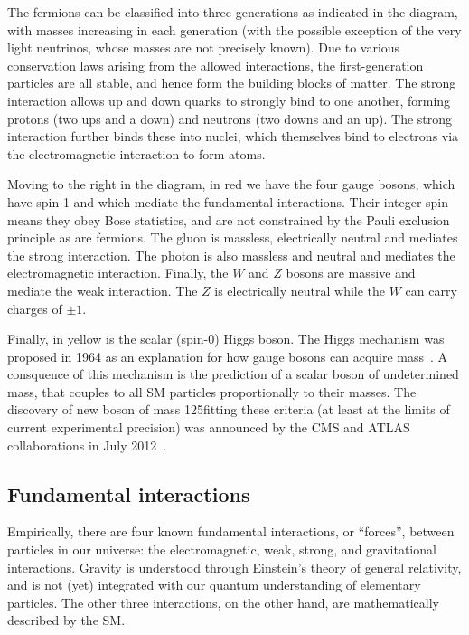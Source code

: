 The fermions can be classified into three generations as indicated in the diagram, with masses
increasing in each generation (with the possible exception of the very light neutrinos, whose
masses are not precisely known). Due to various conservation laws arising from the allowed 
interactions, the first-generation particles are all stable, and hence form the building
blocks of matter. The strong interaction allows up and down quarks to strongly bind to
one another, forming protons (two ups and a down) and neutrons (two downs and an up).
The strong interaction further binds these into nuclei, which themselves bind to electrons via the electromagnetic
interaction to form atoms.

Moving to the right in the diagram, in red we have the four gauge bosons, which have spin-1
and which mediate the fundamental interactions. Their integer spin means they obey Bose statistics,
and are not constrained by the Pauli exclusion principle as are fermions. 
The gluon is massless, electrically neutral and mediates the strong
interaction. The photon is also massless and neutral and mediates the electromagnetic interaction. Finally,
the $W$ and $Z$ bosons are massive and mediate the weak interaction. The $Z$ is electrically neutral while 
the $W$ can carry charges of $\pm1$.

Finally, in yellow is the scalar (spin-0) Higgs boson. The Higgs mechanism was proposed in 1964 as an explanation
for how gauge bosons can acquire mass~\cite{Englert,Higgs,Guralnik}. A consquence of this mechanism is the prediction of a
scalar boson of undetermined mass, that couples to all SM particles proportionally to their masses.
The discovery of new boson of mass 125\GeV fitting these criteria (at least at the limits of current experimental precision) 
was announced by the CMS and ATLAS collaborations in July 2012~\cite{ATLAS:higgs,CMS:higgs}.

\subsection{Fundamental interactions}

Empirically, there are four known fundamental interactions, or ``forces'', between particles in our universe: 
the electromagnetic, weak, strong, and gravitational interactions. Gravity is understood
through Einstein's theory of general relativity, and is not (yet) integrated with our quantum understanding
of elementary particles. The other three interactions, on the other hand, are mathematically described by the
SM.

